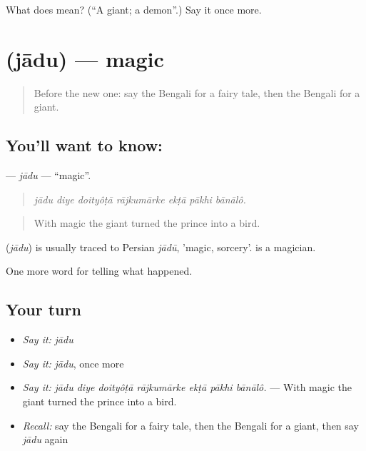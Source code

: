 \begin{tcolorbox}[breakable,colback=teal!4,colframe=teal!35!black,title={Before you move on}]
What does  mean? (\textquotedblleft{}A giant; a demon\textquotedblright{}.) Say it once more.
\end{tcolorbox}
\section[\texorpdfstring{\bn{জাদু} (jādu)}{জাদু (jādu)}]{ (jādu) — magic}

\label{lesson:BN-C321-jadu}



\begin{quote}
Before the new one: say the Bengali for a fairy tale, then the Bengali for a giant.
\end{quote}

\subsection*{You'll want to know: }
\textbf{} — \emph{jādu} — \textquotedblleft{}magic\textquotedblright{}.

\begin{quote}
      
\end{quote}

\begin{quote}
\emph{jādu diye doityôṭā rājkumārke ekṭā pākhi bānālô.}
\end{quote}

\begin{quote}
With magic the giant turned the prince into a bird.
\end{quote}

\begin{cousinweb}
\textbf{} (\emph{jādu}) is usually traced to Persian \emph{jādū}, 'magic, sorcery'.  is a magician.
\end{cousinweb}

\begin{grammarlens}[title={What you've built}]
One more word for telling what happened.
\end{grammarlens}

\subsection*{Your turn}
\begin{itemize}
\raggedright
  \item \emph{Say it:} \emph{jādu}
  \item \emph{Say it:} \emph{jādu}, once more
  \item \emph{Say it:} \emph{jādu diye doityôṭā rājkumārke ekṭā pākhi bānālô.} — With magic the giant turned the prince into a bird.
  \item \emph{Recall:} say the Bengali for a fairy tale, then the Bengali for a giant, then say \emph{jādu} again
\end{itemize}

